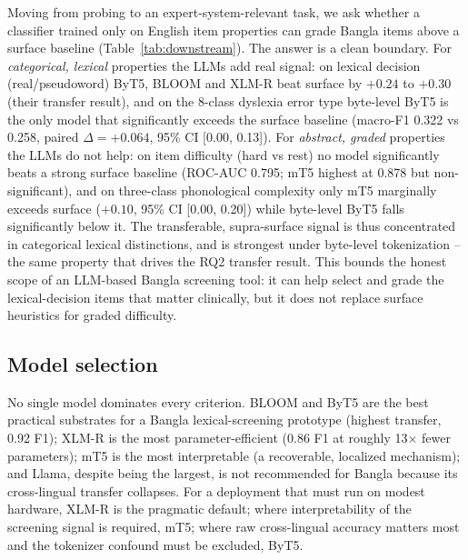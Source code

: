 \documentclass[preprint,12pt]{elsarticle}
\begin{document}
Moving from probing to an expert-system-relevant task, we ask whether a classifier trained only on English item properties can grade Bangla items above a surface baseline (Table~\ref{tab:downstream}). The answer is a clean boundary. For \emph{categorical, lexical} properties the LLMs add real signal: on lexical decision (real/pseudoword) ByT5, BLOOM and XLM-R beat surface by $+0.24$ to $+0.30$ (their transfer result), and on the 8-class dyslexia error type byte-level ByT5 is the only model that significantly exceeds the surface baseline (macro-F1 0.322 vs 0.258, paired $\Delta{=}{+}0.064$, 95\% CI [0.00, 0.13]). For \emph{abstract, graded} properties the LLMs do not help: on item difficulty (hard vs rest) no model significantly beats a strong surface baseline (ROC-AUC 0.795; mT5 highest at 0.878 but non-significant), and on three-class phonological complexity only mT5 marginally exceeds surface ($+0.10$, 95\% CI [0.00, 0.20]) while byte-level ByT5 falls significantly below it. The transferable, supra-surface signal is thus concentrated in categorical lexical distinctions, and is strongest under byte-level tokenization -- the same property that drives the RQ2 transfer result. This bounds the honest scope of an LLM-based Bangla screening tool: it can help select and grade the lexical-decision items that matter clinically, but it does not replace surface heuristics for graded difficulty.

\subsection{Model selection}
No single model dominates every criterion. BLOOM and ByT5 are the best practical substrates for a Bangla lexical-screening prototype (highest transfer, 0.92 F1); XLM-R is the most parameter-efficient (0.86 F1 at roughly 13$\times$ fewer parameters); mT5 is the most interpretable (a recoverable, localized mechanism); and Llama, despite being the largest, is not recommended for Bangla because its cross-lingual transfer collapses. For a deployment that must run on modest hardware, XLM-R is the pragmatic default; where interpretability of the screening signal is required, mT5; where raw cross-lingual accuracy matters most and the tokenizer confound must be excluded, ByT5.

\end{document}
